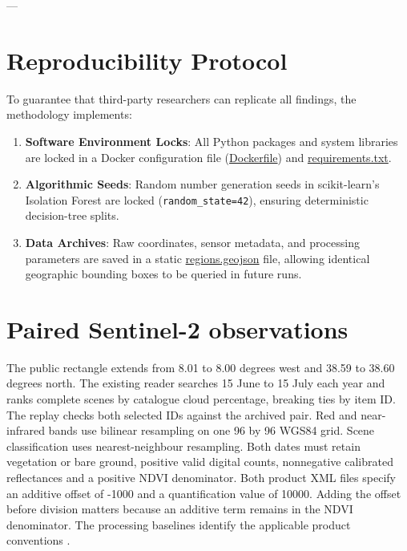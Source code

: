 ---

\section{Reproducibility Protocol}
To guarantee that third-party researchers can replicate all findings, the methodology implements:
\begin{enumerate}
  \item \textbf{Software Environment Locks}: All Python packages and system libraries are locked in a Docker configuration file (\href{file:///d:/CODING/tesis/pipeline/Dockerfile}{Dockerfile}) and \href{file:///d:/CODING/tesis/pipeline/requirements.txt}{requirements.txt}.
  \item \textbf{Algorithmic Seeds}: Random number generation seeds in scikit-learn's Isolation Forest are locked (\texttt{random\_state=42}), ensuring deterministic decision-tree splits.
  \item \textbf{Data Archives}: Raw coordinates, sensor metadata, and processing parameters are saved in a static \href{file:///d:/CODING/tesis/docs/data/regions.geojson}{regions.geojson} file, allowing identical geographic bounding boxes to be queried in future runs.

\end{enumerate}

\section{Paired Sentinel-2 observations}
The public rectangle extends from 8.01 to 8.00 degrees west and 38.59 to 38.60 degrees north. The existing reader searches 15 June to 15 July each year and ranks complete scenes by catalogue cloud percentage, breaking ties by item ID. The replay checks both selected IDs against the archived pair. Red and near-infrared bands use bilinear resampling on one 96 by 96 WGS84 grid. Scene classification uses nearest-neighbour resampling. Both dates must retain vegetation or bare ground, positive valid digital counts, nonnegative calibrated reflectances and a positive NDVI denominator. Both product XML files specify an additive offset of -1000 and a quantification value of 10000. Adding the offset before division matters because an additive term remains in the NDVI denominator. The processing baselines identify the applicable product conventions \cite{S2Processing}.
